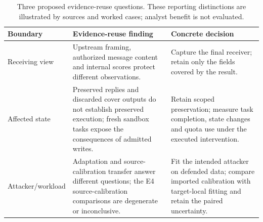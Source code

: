 \begin{table}[t]\centering\footnotesize
\caption{Three proposed evidence-reuse questions. These reporting distinctions are illustrated by sources and worked cases; analyst benefit is not evaluated.}\label{tab:rq-findings}
\begin{tabularx}{\textwidth}{@{}p{}YY@{}}\toprule
Boundary & Evidence-reuse finding & Concrete decision\\\midrule
Receiving view & Upstream framing, authorized message content and internal scores protect different observations. & Capture the final receiver; retain only the fields covered by the result.\\
Affected state & Preserved replies and discarded cover outputs do not establish preserved execution; fresh sandbox tasks expose the consequences of admitted writes. & Retain scoped preservation; measure task completion, state changes and quota use under the executed intervention.\\
Attacker/workload & Adaptation and source-calibration transfer answer different questions; the E4 source-calibration comparisons are degenerate or inconclusive. & Fit the intended attacker on defended data; compare imported calibration with target-local fitting and retain the paired uncertainty.\\
\bottomrule\end{tabularx}\end{table}
